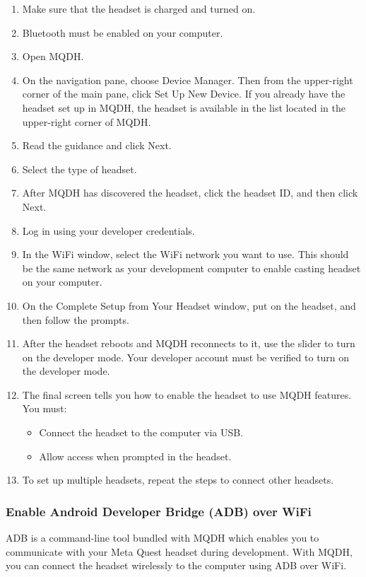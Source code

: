 \documentclass{article}
\begin{document}
\begin{enumerate}
    \item Make sure that the headset is charged and turned on.
    \item Bluetooth must be enabled on your computer.
    \item Open MQDH.
    \item On the navigation pane, choose Device Manager. Then from the upper-right corner of the main pane, click Set Up New Device. If you already have the headset set up in MQDH, the headset is available in the list located in the upper-right corner of MQDH.
    \item Read the guidance and click Next.
    \item Select the type of headset.
    \item After MQDH has discovered the headset, click the headset ID, and then click Next.
    \item Log in using your developer credentials.
    \item In the WiFi window, select the WiFi network you want to use. This should be the same network as your development computer to enable casting headset on your computer.
    \item On the Complete Setup from Your Headset window, put on the headset, and then follow the prompts.
    \item After the headset reboots and MQDH reconnects to it, use the slider to turn on the developer mode. Your developer account must be verified to turn on the developer mode.
    \item The final screen tells you how to enable the headset to use MQDH features. You must:
    \begin{itemize}
        \item Connect the headset to the computer via USB.
        \item Allow access when prompted in the headset.
    \end{itemize}
    \item To set up multiple headsets, repeat the steps to connect other headsets.
\end{enumerate}

\subsubsection{Enable Android Developer Bridge (ADB) over WiFi}

ADB is a command-line tool bundled with MQDH which enables you to communicate with your Meta Quest headset during development. With MQDH, you can connect the headset wirelessly to the computer using ADB over WiFi.
\end{document}
